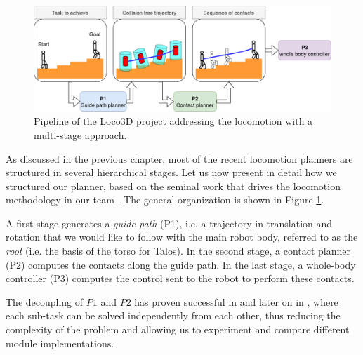 \begin{figure}[h!]
    \centering
    \includegraphics[width=\textwidth]{Figures/Chapter_LEAS/pipeline.png}
    \caption{Pipeline of the Loco3D project addressing the locomotion with a multi-stage approach.}
    \label{fig:pipeline}
\end{figure}


As discussed in the previous chapter, most of the recent locomotion planners are structured in several hierarchical stages. Let us now present in detail how we structured our planner, based on the seminal work that drives the locomotion methodology in our team \cite{loco3d}.
The general organization is shown in Figure \ref{fig:pipeline}.

A first stage generates a \textit{guide path} (P1), i.e. a trajectory in translation and rotation that we would like to follow with the main robot body, referred to as the \textit{root} (i.e. the basis of the torso for Talos). In the second stage, a contact planner (P2) computes the contacts along the guide path. In the last stage, a whole-body controller (P3) computes the control sent to the robot to perform these contacts.

The decoupling of $P1$ and $P2$ has proven successful in \cite{Escande2008Guide, bouyarmane2009} and later on in \cite{loco3d, RB-PRM}, where each sub-task can be solved independently from each other, thus reducing the complexity of the problem and allowing us to experiment and compare different module implementations. 

